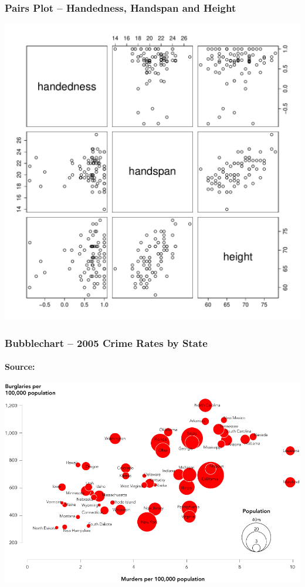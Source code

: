 \documentclass[handout]{beamer}
\begin{document}
\begin{frame}
\frametitle{Pairs Plot -- Handedness, Handspan and Height}
\begin{center}
\includegraphics[scale = 0.38]{./images/pairs}
\end{center}
\end{frame}






\begin{frame}
\frametitle{Bubblechart -- 2005 Crime Rates by State}
\framesubtitle{Source: \href{http://flowingdata.com}{}}
\centering
\includegraphics[scale = 0.30]{./images/crime_bubble2}

\end{frame}




\end{document}

